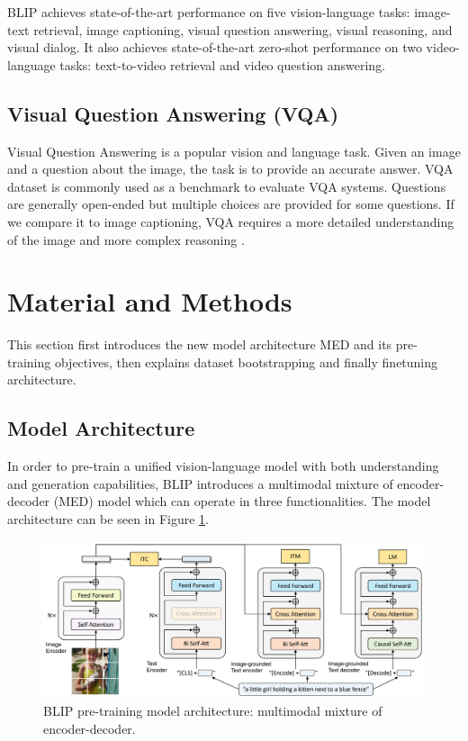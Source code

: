\documentclass[11pt]{article}
\begin{document}
BLIP achieves state-of-the-art performance on five vision-language tasks:  image-text retrieval, image captioning, visual question answering, visual reasoning, and visual dialog. It also achieves state-of-the-art zero-shot performance on two video-language tasks: text-to-video retrieval and video question answering.

\subsection{Visual Question Answering (VQA)}

Visual Question Answering \cite{antol2015vqa} is a popular vision and language task. Given an image and a question about the image, the task is to provide an accurate answer. VQA dataset is commonly used as a benchmark to evaluate VQA systems. Questions are generally open-ended but multiple choices are provided for some questions. If we compare it to image captioning, VQA requires a more detailed understanding of the image and more complex reasoning \cite{antol2015vqa}.

\section{Material and Methods}

This section first introduces the new model architecture MED and its pre-training objectives, then explains dataset bootstrapping and finally finetuning architecture.

\subsection{Model Architecture}

In order to pre-train a unified vision-language model with both understanding and generation capabilities, BLIP introduces a multimodal mixture of encoder-decoder (MED) model which can operate in three functionalities. The model architecture can be seen in Figure \ref{fig:blip_pretraining}.

\begin{figure}
    \centering
    \includegraphics[width=\linewidth]{blip_pretraining.png}
    \caption{BLIP pre-training model architecture: multimodal mixture
of encoder-decoder.}
    \label{fig:blip_pretraining}
\end{figure}
\end{document}

